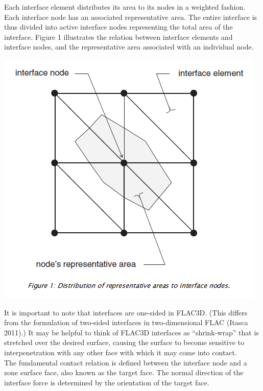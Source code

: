 \documentclass[a4paper, nobind]{templates/ociamthesis}
\begin{document}
Each interface element distributes its area to its nodes in a weighted
fashion. Each interface node has an associated representative area. The
entire interface is thus divided into active interface nodes
representing the total area of the interface. Figure 1 illustrates the
relation between interface elements and interface nodes, and the
representative area associated with an individual node.

\includegraphics[width=1\linewidth]{myfigureeeeee/interface-formulation}

It is important to note that interfaces are one-sided in FLAC3D. (This
differs from the formulation of two-sided interfaces in two-dimensional
FLAC (Itasca 2011).) It may be helpful to think of FLAC3D interfaces as
``shrink-wrap'' that is stretched over the desired surface, causing the
surface to become sensitive to interpenetration with any other face with
which it may come into contact.\\

The fundamental contact relation is defined between the interface node
and a zone surface face, also known as the target face. The normal
direction of the interface force is determined by the orientation of the
target face.\\
\end{document}
